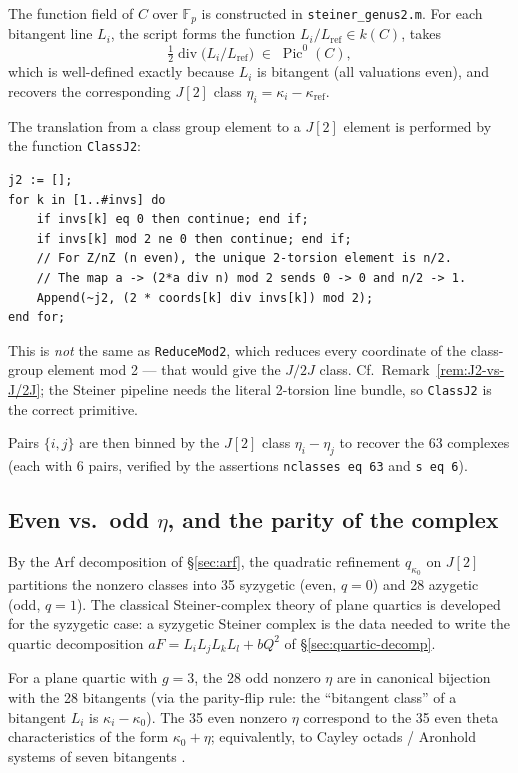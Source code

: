 \documentclass[11pt]{amsart}
\theoremstyle{plain}
\theoremstyle{definition}
\theoremstyle{remark}
\newcommand{\Pic}{\operatorname{Pic}}
\newcommand{\F}{\mathbb F}
\begin{document}
The function field of $C$ over $\F_p$ is constructed in
\texttt{steiner\_genus2.m}. For each bitangent line $L_i$, the script forms
the function $L_i / L_{\mathrm{ref}} \in k(C)$, takes
\[
  \tfrac12 \operatorname{div}\!\bigl(L_i / L_{\mathrm{ref}}\bigr) \;\in\; \Pic^0(C),
\]
which is well-defined exactly because $L_i$ is bitangent (all valuations
even), and recovers the corresponding $J[2]$ class
$\eta_i = \kappa_i - \kappa_{\mathrm{ref}}$.

The translation from a class group element to a $J[2]$ element is performed
by the function \texttt{ClassJ2}:
\begin{verbatim}
j2 := [];
for k in [1..#invs] do
    if invs[k] eq 0 then continue; end if;
    if invs[k] mod 2 ne 0 then continue; end if;
    // For Z/nZ (n even), the unique 2-torsion element is n/2.
    // The map a -> (2*a div n) mod 2 sends 0 -> 0 and n/2 -> 1.
    Append(~j2, (2 * coords[k] div invs[k]) mod 2);
end for;
\end{verbatim}
This is \emph{not} the same as \texttt{ReduceMod2}, which reduces every
coordinate of the class-group element mod 2 --- that would give the $J/2J$
class. Cf.\ Remark~\ref{rem:J2-vs-J/2J}; the Steiner pipeline needs the
literal 2-torsion line bundle, so \texttt{ClassJ2} is the correct primitive.

Pairs $\{i,j\}$ are then binned by the $J[2]$ class $\eta_i - \eta_j$ to
recover the 63 complexes (each with 6 pairs, verified by the assertions
\texttt{nclasses eq 63} and \texttt{s eq 6}).

\subsection{Even vs.\ odd $\eta$, and the parity of the complex}

By the Arf decomposition of \S\ref{sec:arf}, the quadratic refinement
$q_{\kappa_0}$ on $J[2]$ partitions the nonzero classes into 35 syzygetic
(even, $q = 0$) and 28 azygetic (odd, $q = 1$). The classical Steiner-complex
theory of plane quartics is developed for the syzygetic case: a syzygetic
Steiner complex is the data needed to write the quartic decomposition
$aF = L_iL_jL_kL_l + bQ^2$ of \S\ref{sec:quartic-decomp}.

For a plane quartic with $g = 3$, the 28 odd nonzero $\eta$ are in canonical
bijection with the 28 bitangents (via the parity-flip rule: the ``bitangent
class'' of a bitangent $L_i$ is $\kappa_i - \kappa_0$). The 35 even nonzero
$\eta$ correspond to the 35 even theta characteristics of the form
$\kappa_0 + \eta$; equivalently, to Cayley octads / Aronhold systems of seven
bitangents \cite[Ch.\ 6]{Dolgachev2012}.
\end{document}

